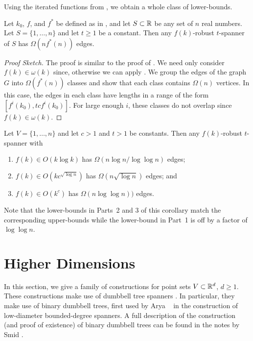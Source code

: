 \documentclass{patmorin}
\begin{document}
Using the iterated functions from , we obtain a whole
class of lower-bounds.

\begin{thm}
  Let $k_0$, $f$, and $f^*$ be defined as in , and let
  $S\subset \mathbb{R}$ be any set of $n$ real numbers.  Let $S=\{1,\ldots,n\}$
  and let $t\ge 1$ be a constant.  Then any $f(k)$-robust $t$-spanner
  of $S$ has $\Omega(nf^*(n))$ edges.
\end{thm}

\begin{proof}[Proof Sketch]
  The proof is similar to the proof of .
  We need only consider $f(k)\in\omega(k)$ since, otherwise we can apply
  .  We group the edges of the graph
  $G$ into $\Omega(f^*(n))$ classes and show that each class contains
  $\Omega(n)$ vertices.  In this case, the edges in each class have
  lengths in a range of the form $[f^i(k_0),tcf^{i}(k_0)]$.  For large
  enough $i$, these classes do not overlap since $f(k)\in\omega(k)$.
\end{proof}

\begin{cor}
  Let $V=\{1,\ldots,n\}$ and let $c>1$ and $t>1$ be constants.  Then any
  $f(k)$-robust $t$-spanner with
  \begin{enumerate}
    \item $f(k)\in O(k\log k)$ has $\Omega(n\log n/\log\log n)$ edges;
    \item $f(k)\in O(kc^{\sqrt{\log n}})$ has $\Omega(n\sqrt{\log n})$
      edges; and
    \item $f(k)\in O(k^{c})$ has $\Omega(n\log\log n))$ edges.
  \end{enumerate}
\end{cor}

Note that the lower-bounds in Parts~2 and 3 of this corollary match the
corresponding upper-bounds while the lower-bound in Part~1 is off by a
factor of $\log\log n$.


\section{Higher Dimensions}

In this section, we give a family of constructions for point sets
$V\subset\mathbb{R}^d$, $d\ge 1$.  These constructions make use of dumbbell
tree spanners \cite[Chapter~11]{ns07}.  In particular, they make use of
binary dumbbell trees, first used by Arya \etal\ \cite{admss95} in the
construction of low-diameter bounded-degree spanners.  A full description
of the construction (and proof of existence) of binary dumbbell trees
can be found in the notes by Smid \cite{s12}.
\end{document}

